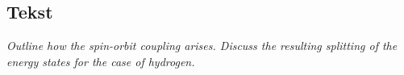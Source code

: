 \subsection{Tekst}

\emph{Outline how the spin-orbit coupling arises. Discuss the resulting splitting of the energy states for the case of hydrogen.}